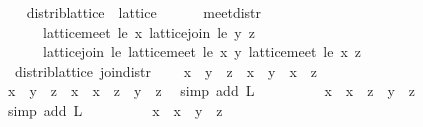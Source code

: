 \begin{isabellebody}
\endisatagproof
{\isafoldproof}%
%
\isadelimproof
\isanewline
%
\endisadelimproof
\isanewline
\ \ \isamarkupfalse%
\ distrib{\isacharunderscore}lattice\ {\isacharequal}\ lattice\ {\isacharplus}\isanewline
\ \ \ \ \ meet{\isacharunderscore}distr{\isacharcolon}\isanewline
\ \ \ \ \ \ {\isachardoublequoteopen}lattice{\isachardot}meet\ le\ x\ {\isacharparenleft}lattice{\isachardot}join\ le\ y\ z{\isacharparenright}\ {\isacharequal}\isanewline
\ \ \ \ \ \ lattice{\isachardot}join\ le\ {\isacharparenleft}lattice{\isachardot}meet\ le\ x\ y{\isacharparenright}\ {\isacharparenleft}lattice{\isachardot}meet\ le\ x\ z{\isacharparenright}{\isachardoublequoteclose}\isanewline
\isanewline
\ \ \isamarkupfalse%
\ {\isacharparenleft}\ distrib{\isacharunderscore}lattice{\isacharparenright}\ join{\isacharunderscore}distr{\isacharcolon}\isanewline
\ \ \ \ {\isachardoublequoteopen}x\ {\isasymsqunion}\ {\isacharparenleft}y\ {\isasymsqinter}\ z{\isacharparenright}\ {\isacharequal}\ {\isacharparenleft}x\ {\isasymsqunion}\ y{\isacharparenright}\ {\isasymsqinter}\ {\isacharparenleft}x\ {\isasymsqunion}\ z{\isacharparenright}{\isachardoublequoteclose}\ \ \isanewline
%
\isadelimproof
\ \ \ \ %
\endisadelimproof
%
\isatagproof
{}\isamarkupfalse%
\ {\isacharminus}\isanewline
\ \ \ \ \isamarkupfalse%
\ {\isachardoublequoteopen}x\ {\isasymsqunion}\ {\isacharparenleft}y\ {\isasymsqinter}\ z{\isacharparenright}\ {\isacharequal}\ {\isacharparenleft}x\ {\isasymsqunion}\ {\isacharparenleft}x\ {\isasymsqinter}\ z{\isacharparenright}{\isacharparenright}\ {\isasymsqunion}\ {\isacharparenleft}y\ {\isasymsqinter}\ z{\isacharparenright}{\isachardoublequoteclose}\ \isamarkupfalse%
\ {\isacharparenleft}simp\ add{\isacharcolon}\ L{}{\isacharparenright}\isanewline
\ \ \ \ \isamarkupfalse%
\ \isamarkupfalse%
\ {\isachardoublequoteopen}{\isachardot}{\isachardot}{\isachardot}\ {\isacharequal}\ x\ {\isasymsqunion}\ {\isacharparenleft}{\isacharparenleft}x\ {\isasymsqinter}\ z{\isacharparenright}\ {\isasymsqunion}\ {\isacharparenleft}y\ {\isasymsqinter}\ z{\isacharparenright}{\isacharparenright}{\isachardoublequoteclose}\ \isamarkupfalse%
\ {\isacharparenleft}simp\ add{\isacharcolon}\ L{}{\isacharparenright}\isanewline
\ \ \ \ \isamarkupfalse%
\ \isamarkupfalse%
\ {\isachardoublequoteopen}{\isachardot}{\isachardot}{\isachardot}\ {\isacharequal}\ x\ {\isasymsqunion}\ {\isacharparenleft}{\isacharparenleft}x\ {\isasymsqunion}\ y{\isacharparenright}\ {\isasymsqinter}\ z{\isacharparenright}{\isachardoublequoteclose}\ \isamarkupfalse%

\end{isabellebody}
